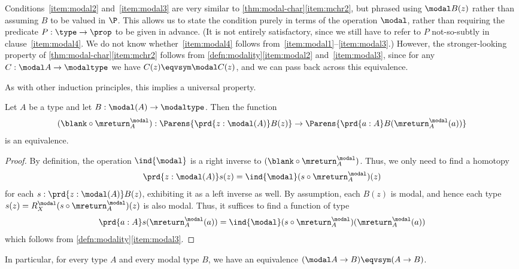 Conditions~\ref{item:modal2} and~\ref{item:modal3} are very similar to \cref{thm:modal-char}\ref{item:mchr2}, but phrased using $\modal B(z)$ rather than assuming $B$ to be valued in $\P$.
This allows us to state the condition purely in terms of the operation $\modal$, rather than requiring the predicate $P:\type\to\prop$ to be given in advance.
(It is not entirely satisfactory, since we still have to refer to $P$ not-so-subtly in clause~\ref{item:modal4}.
We do not know whether~\ref{item:modal4} follows from~\ref{item:modal1}--\ref{item:modal3}.)
However, the stronger-looking property of \cref{thm:modal-char}\ref{item:mchr2} follows from \cref{defn:modality}\ref{item:modal2} and~\ref{item:modal3}, since for any $C:\modal A \to \modaltype$ we have $C(z) \eqvsym \modal C(z)$, and we can pass back across this equivalence.

%
As with other induction principles, this implies a universal property.

\begin{thm}\label{prop:lv_n_deptype_sec_equiv_by_precomp}
Let $A$ be a type and let $B:\modal(A)\to\modaltype$. Then the function
\begin{equation*}
(\blank\circ \mreturn^\modal_A) : \Parens{\prd{z:\modal(A)}B(z)} \to \Parens{\prd{a:A}B(\mreturn^\modal_A(a))}
\end{equation*}
is an equivalence.
\end{thm}
\begin{proof}
By definition, the operation $\ind{\modal}$ is a right inverse to $(\blank\circ \mreturn^\modal_A)$.
Thus, we only need to find a homotopy
\begin{equation*}
\prd{z:\modal(A)}s(z)= \ind{\modal}(s\circ \mreturn^\modal_A)(z)
\end{equation*}
for each $s:\prd{z:\modal(A)}B(z)$, exhibiting it as a left inverse as well.
By assumption, each $B(z)$ is modal, and hence each type $s(z)= R^\modal_X(s\circ \mreturn^\modal_A)(z)$
is also modal.
Thus, it suffices to find a function of type
\begin{equation*}
\prd{a:A}s(\mreturn^\modal_A(a))= \ind{\modal}(s\circ \mreturn^\modal_A)(\mreturn^\modal_A(a))
\end{equation*}
which follows from \cref{defn:modality}\ref{item:modal3}.
\end{proof}

In particular, for every type $A$ and every modal type $B$, we have an equivalence $(\modal A\to B)\eqvsym (A\to B)$.

